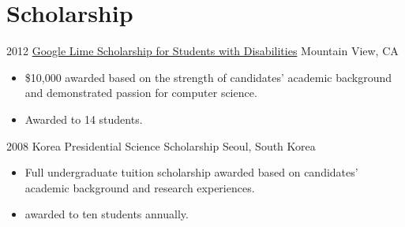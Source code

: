 \documentclass[]{patyoon-cv}
\begin{document}

\section{Scholarship}

\begin{entrylist}
  \entry
  {2012}
  {\href{http://www.limeconnect.com/opportunities/page/google-lime-scholarship-program}
    {Google Lime Scholarship for Students with Disabilities}}
  {Mountain View, CA}
  {\begin{itemize}
    \item \$10,000 awarded based on the strength of candidates' academic background and demonstrated passion for computer science.
    \item Awarded to 14 students.
    \end{itemize}
  }
  \entry
  {2008}
  {Korea Presidential Science Scholarship}
  {Seoul, South Korea}
  {\begin{itemize}
    \item Full undergraduate tuition scholarship awarded based on candidates' academic background and research experiences.
    \item awarded to ten students annually.
    \end{itemize}
  }
\end{entrylist}
\end{document}
